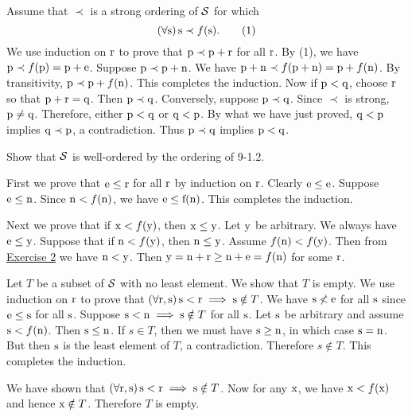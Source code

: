 \begin{solution}
Assume that $\prec$ is a strong ordering of $\mathcal{S}$ for which
\[(\forall \mathrm{s})\thinspace \mathrm{s} \prec f(\mathrm{s}).\tag{1}\]
We use induction on $\mathrm{r}$ to prove that $\mathrm{p}\prec \mathrm{p}+\mathrm{r}$ for all $\mathrm{r}$.
By (1), we have $\mathrm{p} \prec f(\mathrm{p})=\mathrm{p} + \mathrm{e}$.
Suppose $\mathrm{p} \prec \mathrm{p} + \mathrm{n}$.
We have $\mathrm{p} + \mathrm{n}\prec f(\mathrm{p} + \mathrm{n})=\mathrm{p} + f(\mathrm{n})$. By transitivity, $\mathrm{p}\prec \mathrm{p} + f(\mathrm{n})$.
This completes the induction.
Now if $\mathrm{p} < \mathrm{q}$, choose $\mathrm{r}$ so that $\mathrm{p} + \mathrm{r} = \mathrm{q}$.
Then $\mathrm{p}\prec \mathrm{q}$.
Conversely, suppose $\mathrm{p}\prec \mathrm{q}$. Since $\prec$ is strong, $\mathrm{p}\neq\mathrm{q}$.
Therefore, either $\mathrm{p} < \mathrm{q}$ or $\mathrm{q} < \mathrm{p}$.
By what we have just proved, $\mathrm{q} < \mathrm{p}$ implies $\mathrm{q}\prec\mathrm{p}$, a contradiction.
Thus $\mathrm{p}\prec \mathrm{q}$ implies $\mathrm{p} < \mathrm{q}$.
\end{solution}

\begin{exercise}
Show that $\mathcal{S}$ is well-ordered by the ordering of 9-1.2.
\end{exercise}

\begin{solution}
First we prove that $\mathrm{e}\leq\mathrm{r}$ for all $\mathrm{r}$ by induction on $\mathrm{r}$.
Clearly $\mathrm{e}\leq\mathrm{e}$. Suppose $\mathrm{e}\leq\mathrm{n}$.
Since $\mathrm{n} < f(\mathrm{n})$, we have $\mathrm{e} \leq \mathrm{f}(\mathrm{n})$. This completes the induction.

Next we prove that if $\mathrm{x} < f(\mathrm{y})$, then $\mathrm{x} \leq \mathrm{y}$.
Let $\mathrm{y}$ be arbitrary.
We always have $\mathrm{e} \leq \mathrm{y}$.
Suppose that if $\mathrm{n} < f(\mathrm{y})$, then $\mathrm{n} \leq \mathrm{y}$.
Assume $f(\mathrm{n}) < f(\mathrm{y})$. Then from \hyperref[ex:9-1.2]{Exercise 2} we have $\mathrm{n} < \mathrm{y}$.
Then $\mathrm{y}=\mathrm{n}+\mathrm{r}\geq \mathrm{n} + \mathrm{e}=f(\mathrm{n})$ for some $\mathrm{r}$.

Let $T$ be a subset of $\mathcal{S}$ with no least element. We show that $T$ is empty.
We use induction on $\mathrm{r}$ to prove that $(\forall \mathrm{r},\mathrm{s})\thinspace \mathrm{s} < \mathrm{r} \implies \mathrm{s} \notin T$.
We have $\mathrm{s}\nless \mathrm{e}$ for all $\mathrm{s}$ since $\mathrm{e}\leq \mathrm{s}$ for all $\mathrm{s}$.
Suppose $\mathrm{s} < \mathrm{n} \implies \mathrm{s} \notin T$ for all $\mathrm{s}$.
Let $\mathrm{s}$ be arbitrary and assume $\mathrm{s} < f(\mathrm{n})$.
Then $\mathrm{s}\leq \mathrm{n}$. If $s\in T$, then we must have $\mathrm{s}\geq\mathrm{n}$, in which case $\mathrm{s} = \mathrm{n}$.
But then $\mathrm{s}$ is the least element of $T$, a contradiction.
Therefore $s\nin T$. This completes the induction.

We have shown that $(\forall \mathrm{r},\mathrm{s})\thinspace \mathrm{s} < \mathrm{r} \implies \mathrm{s} \notin T$.
Now for any $\mathrm{x}$, we have $\mathrm{x} < f(\mathrm{x})$ and hence $\mathrm{x}\notin T$.
Therefore $T$ is empty.
\end{solution}


